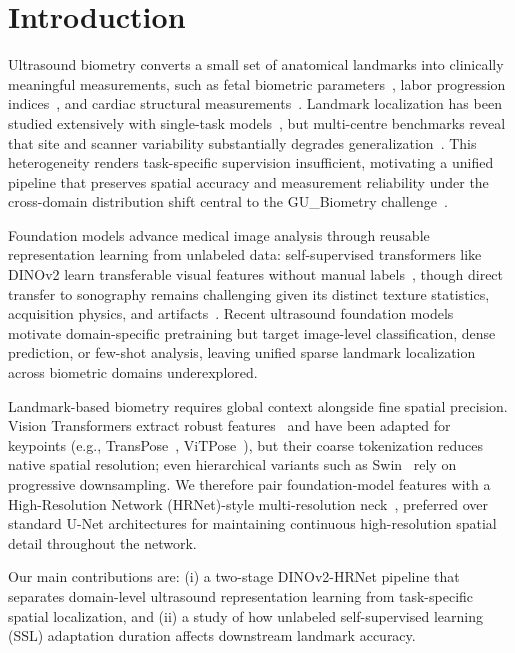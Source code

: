 \documentclass[runningheads]{llncs}
\begin{document}
\section{Introduction}
Ultrasound biometry converts a small set of anatomical landmarks into clinically meaningful measurements, such as fetal biometric parameters~\cite{salomon2019isuog}, labor progression indices~\cite{ghi2018isuog,ramirez2025intrapartum}, and cardiac structural measurements~\cite{mitchell2019comprehensive}. Landmark localization has been studied extensively with single-task models~\cite{avisdris2022biometrynet,bai2026iugc,zhou2020aop,lu2022aop,bai2025landmarkchallenge}, but multi-centre benchmarks reveal that site and scanner variability substantially degrades generalization~\cite{bai2026beyond,divece2026multicentre}. This heterogeneity renders task-specific supervision insufficient, motivating a unified pipeline that preserves spatial accuracy and measurement reliability under the cross-domain distribution shift central to the GU\_Biometry challenge~\cite{gu_biometry,deng2026baseline}.

Foundation models advance medical image analysis through reusable representation learning from unlabeled data: self-supervised transformers like DINOv2 learn transferable visual features without manual labels~\cite{oquab2023dinov2}, though direct transfer to sonography remains challenging given its distinct texture statistics, acquisition physics, and artifacts~\cite{guan2022domain}. Recent ultrasound foundation models~\cite{jiao2024usfm,ambsdorf2025general,lin2025uusic} motivate domain-specific pretraining but target image-level classification, dense prediction, or few-shot analysis, leaving unified sparse landmark localization across biometric domains underexplored.

Landmark-based biometry requires global context alongside fine spatial precision. Vision Transformers extract robust features~\cite{dosovitskiy2021image,oquab2023dinov2} and have been adapted for keypoints (e.g., TransPose~\cite{yang2021transpose}, ViTPose~\cite{xu2022vitpose}), but their coarse tokenization reduces native spatial resolution; even hierarchical variants such as Swin~\cite{liu2021swin} rely on progressive downsampling. We therefore pair foundation-model features with a High-Resolution Network (HRNet)-style multi-resolution neck~\cite{sun2019hrnet}, preferred over standard U-Net architectures for maintaining continuous high-resolution spatial detail throughout the network.

Our main contributions are: (i) a two-stage DINOv2-HRNet pipeline that separates domain-level ultrasound representation learning from task-specific spatial localization, and (ii) a study of how unlabeled self-supervised learning (SSL) adaptation duration affects downstream landmark accuracy.
\end{document}
